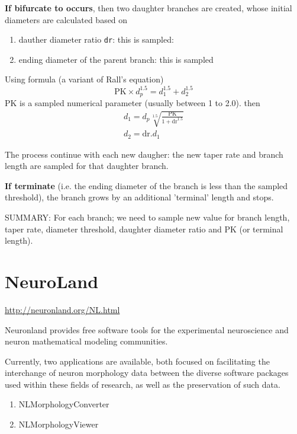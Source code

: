 {\bf If bifurcate to occurs}, then two daughter branches  are created, whose
initial diameters are calculated based on 
\begin{enumerate}
  \item dauther diameter ratio \verb!dr!: this is sampled:
  
  \item ending diameter of the parent branch: this is sampled
\end{enumerate}

Using formula (a variant of Rall's equation)
\def\PK{{\text{PK}}}
\begin{equation}
\PK \times d_p^{1.5} = d_1^{1.5} + d_2^{1.5}
\end{equation}
PK is a sampled numerical parameter (usually between 1 to 2.0).
then
\def\dr{{\text{dr}}}
\begin{equation}
\begin{split}
d_1 = d_p \sqrt[1.5]{\frac{\PK}{1+ \dr^{1.5}}} \\
d_2 = \dr . d_1
\end{split}
\end{equation}

The process continue with each new daugher: the new taper rate and branch length
are sampled for that daughter branch.

{\bf If terminate} (i.e. the ending diameter of the branch is less than the
sampled threshold), the branch grows by an additional 'terminal' length and
stops.

SUMMARY: For each branch; we need to sample new value for branch length, taper
rate, diameter threshold, daughter diameter ratio and PK (or terminal length).



\section{NeuroLand}
\label{sec:NeuroLand}

\url{http://neuronland.org/NL.html}

Neuronland provides free software tools for the experimental neuroscience and
neuron mathematical modeling communities.

Currently, two applications are available, both focused on facilitating the
interchange of neuron morphology data between the diverse software packages used
within these fields of research, as well as the preservation of such data.
\begin{enumerate}
  \item NLMorphologyConverter
  
  \item NLMorphologyViewer
\end{enumerate}

